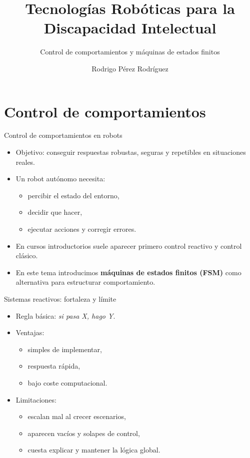 \documentclass[aspectratio=169]{beamer}
\author{Rodrigo Pérez Rodríguez}
\title{Tecnologías Robóticas para la Discapacidad Intelectual}
\subtitle{Control de comportamientos y máquinas de estados finitos}
\date{}
\begin{document}
\begin{frame}
    \titlepage
\end{frame}

\begin{frame}
    \tableofcontents[sectionstyle=show,subsectionstyle=show/shaded/hide,subsubsectionstyle=show/shaded/hide]
\end{frame}

\section{Control de comportamientos}

\begin{frame}{Control de comportamientos en robots}
\small
\begin{itemize}
  \item Objetivo: conseguir respuestas robustas, seguras y repetibles en situaciones reales.
  \item Un robot autónomo necesita:
  \begin{itemize}
    \item percibir el estado del entorno,
    \item decidir que hacer,
    \item ejecutar acciones y corregir errores.
  \end{itemize}
  \item En cursos introductorios suele aparecer primero control reactivo y control clásico.
  \item En este tema introducimos \textbf{máquinas de estados finitos (FSM)} como alternativa para estructurar comportamiento.
\end{itemize}
\end{frame}

\begin{frame}{Sistemas reactivos: fortaleza y límite}
\small
\begin{itemize}
  \item Regla básica: \textit{si pasa X, hago Y}.
  \item Ventajas:
  \begin{itemize}
    \item simples de implementar,
    \item respuesta rápida,
    \item bajo coste computacional.
  \end{itemize}
  \item Limitaciones:
  \begin{itemize}
    \item escalan mal al crecer escenarios,
    \item aparecen vacíos y solapes de control,
    \item cuesta explicar y mantener la lógica global.
  \end{itemize}
\end{itemize}
\end{frame}
\end{document}
